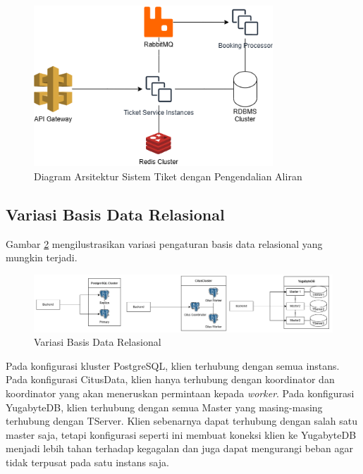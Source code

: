 \begin{figure}[htbp]
    \centering
    \includegraphics[width=0.8\textwidth]{resources/chapter-3/ticket-fc.png}
    \caption{Diagram Arsitektur Sistem Tiket dengan Pengendalian Aliran}
    \label{fig:ticket-fc}
\end{figure}

\subsection{Variasi Basis Data Relasional}

Gambar \ref{fig:rdbms-variation} mengilustrasikan variasi pengaturan basis data relasional yang mungkin terjadi.

\begin{figure}[htbp]
    \centering
    \includegraphics[width=1\textwidth]{resources/chapter-3/rdbms.png}
    \caption{Variasi Basis Data Relasional}
    \label{fig:rdbms-variation}
\end{figure}

Pada konfigurasi kluster PostgreSQL, klien terhubung dengan semua instans. Pada konfigurasi CitusData, klien hanya terhubung dengan koordinator dan koordinator yang akan meneruskan permintaan kepada \textit{worker}. Pada konfigurasi YugabyteDB, klien terhubung dengan semua Master yang masing-masing terhubung dengan TServer. Klien sebenarnya dapat terhubung dengan salah satu master saja, tetapi konfigurasi seperti ini membuat koneksi klien ke YugabyteDB menjadi lebih tahan terhadap kegagalan dan juga dapat mengurangi beban agar tidak terpusat pada satu instans saja.

